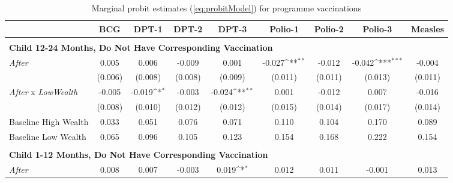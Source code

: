 \begin{table}[htbp]\centering \footnotesize {}\caption{\label{tab:analysisVaccDetailed} \footnotesize Marginal probit estimates (\cref{eq:probitModel}) for programme vaccinations}\begin{tabular}{l*{8}{c}} \hline\hline
                    &\multicolumn{1}{c}{BCG}&\multicolumn{1}{c}{DPT-1}&\multicolumn{1}{c}{DPT-2}&\multicolumn{1}{c}{DPT-3}&\multicolumn{1}{c}{Polio-1}&\multicolumn{1}{c}{Polio-2}&\multicolumn{1}{c}{Polio-3}&\multicolumn{1}{c}{Measles}\\
\hline \\ [-2em] \multicolumn{9}{l}{\textbf{Child 12-24 Months, Do Not Have Corresponding Vaccination}} \\
\textit{After}      &       0.005         &       0.006         &      -0.009         &       0.001         &      -0.027\sym{**} &      -0.012         &      -0.042\sym{***}&      -0.004         \\
                    &     (0.006)         &     (0.008)         &     (0.008)         &     (0.009)         &     (0.011)         &     (0.011)         &     (0.013)         &     (0.011)         \\
[1em]
\textit{After} x \textit{LowWealth}&      -0.005         &      -0.019\sym{*}  &      -0.003         &      -0.024\sym{**} &       0.001         &      -0.012         &       0.007         &      -0.016         \\
                    &     (0.008)         &     (0.010)         &     (0.012)         &     (0.012)         &     (0.015)         &     (0.014)         &     (0.017)         &     (0.014)         \\
\hline
Baseline High Wealth&       0.033         &       0.051         &       0.076         &       0.071         &       0.110         &       0.104         &       0.170         &       0.089         \\
Baseline Low Wealth &       0.065         &       0.096         &       0.105         &       0.123         &       0.154         &       0.168         &       0.222         &       0.154         \\
\\ [-2em] \hline \multicolumn{9}{l}{\textbf{Child 1-12 Months, Do Not Have Corresponding Vaccination}} \\
\textit{After}      &       0.008         &       0.007         &      -0.003         &       0.019\sym{*}  &       0.012         &       0.011         &      -0.001         &       0.013         \\

\end{tabular}
\end{table}

